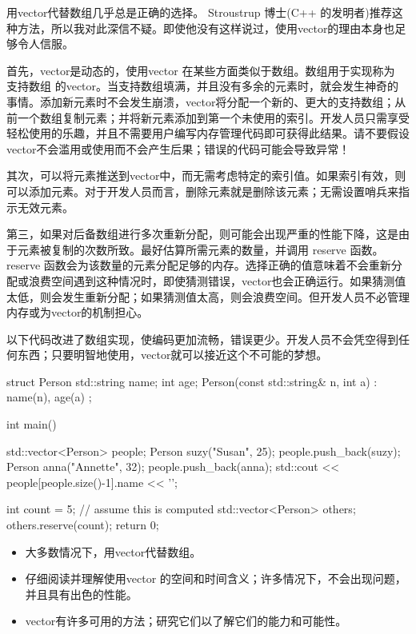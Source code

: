 
用vector代替数组几乎总是正确的选择。 Stroustrup 博士(C++ 的发明者)推荐这种方法，所以我对此深信不疑。即使他没有这样说过，使用vector的理由本身也足够令人信服。

首先，vector是动态的，使用vector 在某些方面类似于数组。数组用于实现称为 支持数组 的vector。当支持数组填满，并且没有多余的元素时，就会发生神奇的事情。添加新元素时不会发生崩溃，vector将分配一个新的、更大的支持数组；从前一个数组复制元素；并将新元素添加到第一个未使用的索引。开发人员只需享受轻松使用的乐趣，并且不需要用户编写内存管理代码即可获得此结果。请不要假设vector不会滥用或使用而不会产生后果；错误的代码可能会导致异常！

其次，可以将元素推送到vector中，而无需考虑特定的索引值。如果索引有效，则可以添加元素。对于开发人员而言，删除元素就是删除该元素；无需设置哨兵来指示无效元素。

第三，如果对后备数组进行多次重新分配，则可能会出现严重的性能下降，这是由于元素被复制的次数所致。最好估算所需元素的数量，并调用 reserve 函数。reserve 函数会为该数量的元素分配足够的内存。选择正确的值意味着不会重新分配或浪费空间遇到这种情况时，即使猜测错误，vector也会正确运行。如果猜测值太低，则会发生重新分配；如果猜测值太高，则会浪费空间。但开发人员不必管理内存或为vector的机制担心。

以下代码改进了数组实现，使编码更加流畅，错误更少。开发人员不会凭空得到任何东西；只要明智地使用，vector就可以接近这个不可能的梦想。


\begin{cpp}
struct Person {
  std::string name;
  int age;
  Person(const std::string& n, int a) : name(n), age(a) {}
};

int main() {
  std::vector<Person> people;
  Person suzy("Susan", 25);
  people.push_back(suzy);
  Person anna("Annette", 32);
  people.push_back(anna);
  std::cout << people[people.size()-1].name << '\n';

  int count = 5; // assume this is computed
  std::vector<Person> others;
  others.reserve(count);
  return 0;
}
\end{cpp}


\begin{itemize}
\item
大多数情况下，用vector代替数组。

\item
仔细阅读并理解使用vector 的空间和时间含义；许多情况下，不会出现问题，并且具有出色的性能。

\item
vector有许多可用的方法；研究它们以了解它们的能力和可能性。
\end{itemize}













